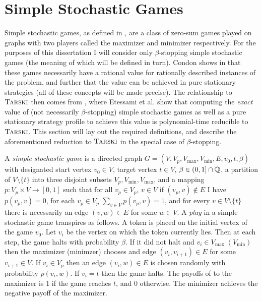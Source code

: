 \section{Simple Stochastic Games}
Simple stochastic games, as defined in \citep{condon}, are a class of
zero-sum games played on graphs with two players called the maximizer and minimizer
respectively. For the purposes of this dissertation I will consider only $\beta$-stopping
simple stochastic games (the meaning of which will be defined in turn).
Condon shows in \citep{condon} that these games necessarily have a rational value for rationally described instances
of the problem, and further that
the value can be achieved in pure stationary strategies (all of these concepts will be made precise).
The relationship to $\textsc{Tarski}$ then comes from \citep{lowerBound}, where Etessami et al. show
that computing the \emph{exact} value of (not necessarily $\beta$-stopping) simple stochastic games as well as a pure stationary strategy profile
to achieve this value is 
polynomial-time reducible to $\textsc{Tarski}$. This section will lay out the required definitions,
and describe the aforementioned reduction to $\textsc{Tarski}$ in the special case of $\beta$-stopping.
\newcommand{\vmax}{V_{\max}}
\newcommand{\vmin}{V_{\min}}
\begin{definition}
  A \emph{simple stochastic game} is a directed graph $G = (V, V_p, \vmax, \vmin, E, v_0, t, \beta)$ with designated start vertex $v_0 \in V$,
  target vertex $t \in V$, $\beta \in (0, 1] \cap \mathbb{Q}$,
  a partition of $V \setminus \{t\}$ into three disjoint subsets $V_p, V_{\min}, V_{\max}$,
  and a mapping $p : V_p \times V \to [0, 1]$ such that for all $v_p \in V_p$,
  $v \in V$ if $(v_p, v) \not\in E$ I have $p(v_p, v) = 0$, for each
  $v_p \in V_p$ $\sum_{v \in V} p(v_p, v) = 1$, and for every $v \in V \setminus \{t\}$ there
  is necessarily an edge $(v, w) \in E$ for some $w \in V$. A \emph{play} in a simple stochastic game
  transpires as follows. A token is placed on the initial vertex of the game $v_0$.
  Let $v_i$ be the vertex on which the token currently lies. Then at each step, the game halts with probability $\beta$. If it did not halt and $v_i \in \vmax \; (\vmin)$
  then the maximizer (minimzer) chooses and edge $(v_i, v_{i + 1}) \in E$ for some $v_{i + 1} \in V$. If
  $v_i \in V_p$ then an edge $(v_i, w) \in E$ is chosen randomly with probability $p(v_i, w)$. If $v_i = t$
  then the game halts. The payoffs of to the maximizer is $1$ if the game reaches $t$, and $0$ otherwise.
  The minimizer achieves the negative payoff of the maximizer.
\end{definition}

